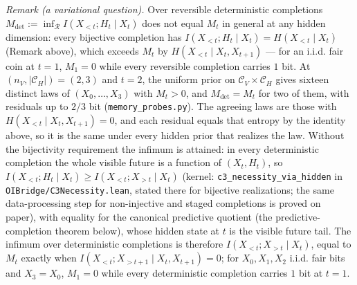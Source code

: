 \documentclass[
]{article}
\begin{document}
\emph{Remark (a variational question).} Over reversible deterministic
completions
\(M_{\mathrm{det}} := \inf_{\mathcal{R}} I(X_{<t}; H_t \mid X_t)\) does
not equal \(M_t\) in general at any hidden dimension: every bijective
completion has \(I(X_{<t}; H_t \mid X_t) = H(X_{<t} \mid X_t)\) (Remark
above), which exceeds \(M_t\) by \(H(X_{<t} \mid X_t, X_{t+1})\) --- for
an i.i.d. fair coin at \(t = 1\), \(M_1 = 0\) while every reversible
completion carries \(1\) bit. At \((n_V, |\mathcal{C}_H|) = (2,3)\) and
\(t = 2\), the uniform prior on \(\mathcal{C}_V \times \mathcal{C}_H\)
gives sixteen distinct laws of \((X_0,\ldots,X_3)\) with \(M_t > 0\),
and \(M_{\mathrm{det}} = M_t\) for two of them, with residuals up to
\(2/3\) bit (\texttt{memory\_probes.py}). The agreeing laws are those
with \(H(X_{<t} \mid X_t, X_{t+1}) = 0\), and each residual equals that
entropy by the identity above, so it is the same under every hidden
prior that realizes the law. Without the bijectivity requirement the
infimum is attained: in every deterministic completion the whole visible
future is a function of \((X_t, H_t)\), so
\(I(X_{<t}; H_t \mid X_t) \geq I(X_{<t}; X_{>t} \mid X_t)\) (kernel:
\texttt{c3\_necessity\_via\_hidden} in
\texttt{OIBridge/C3Necessity.lean}, stated there for bijective
realizations; the same data-processing step for non-injective and staged
completions is proved on paper), with equality for the canonical
predictive quotient (the predictive-completion theorem below), whose
hidden state at \(t\) is the visible future tail. The infimum over
deterministic completions is therefore \(I(X_{<t}; X_{>t} \mid X_t)\),
equal to \(M_t\) exactly when
\(I(X_{<t}; X_{>t+1} \mid X_t, X_{t+1}) = 0\); for \(X_0, X_1, X_2\)
i.i.d. fair bits and \(X_3 = X_0\), \(M_1 = 0\) while every
deterministic completion carries \(1\) bit at \(t = 1\).
\end{document}
